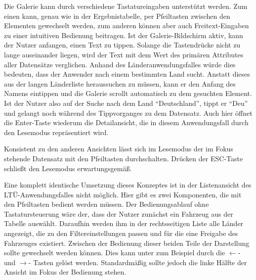 Die Galerie kann durch verschiedene Tastatureingaben unterstützt werden. Zum einen kann, genau wie in der Ergebnistabelle, per Pfeiltasten zwischen den Elementen gewechselt werden, zum anderen können aber auch Freitext-Eingaben zu einer intuitiven Bedienung beitragen. Ist der Galerie-Bildschirm aktiv, kann der Nutzer anfangen, einen Text zu tippen. Solange die Tastendrücke nicht zu lange auseinander liegen, wird der Text mit dem Wert des primären Attributes aller Datensätze verglichen. Anhand des Länderanwendungsfalles würde dies bedeuten, dass der Anwender nach einem bestimmten Land sucht. Anstatt dieses aus der langen Länderliste heraussuchen zu müssen, kann er den Anfang des Namens eintippen und die Galerie scrollt automatisch zu dem gesuchten Element. Ist der Nutzer also auf der Suche nach dem Land \enquote{Deutschland}, tippt er \enquote{Deu} und gelangt noch während des Tippvorganges zu dem Datensatz. Auch hier öffnet die Enter-Taste wiederum die Detailansicht, die in diesem Anwendungsfall durch den Lesemodus repräsentiert wird.\par
Konsistent zu den anderen Ansichten lässt sich im Lesemodus der im Fokus stehende Datensatz mit den Pfeiltasten durchschalten. Drücken der ESC-Taste schließt den Lesemodus erwartungsgemäß. \par
Eine komplett identische Umsetzung dieses Konzeptes ist in der Listenansicht des LTÜ-Anwendungsfalles nicht möglich. Hier gibt es zwei Komponenten, die mit den Pfeiltasten bedient werden müssen. Der Bedienungsablauf ohne Tastatursteuerung wäre der, dass der Nutzer zunächst ein Fahrzeug aus der Tabelle auswählt. Daraufhin werden ihm in der rechtsseitigen Liste alle Länder angezeigt, die zu den Filtereinstellungen passen und für die eine Freigabe des Fahrzeuges existiert. Zwischen der Bedienung dieser beiden Teile der Darstellung sollte gewechselt werden können. Dies kann unter zum Beispiel durch die $\leftarrow$- und $\rightarrow$- Tasten gelöst werden. Standardmäßig sollte jedoch die linke Hälfte der Ansicht im Fokus der Bedienung stehen.\par
